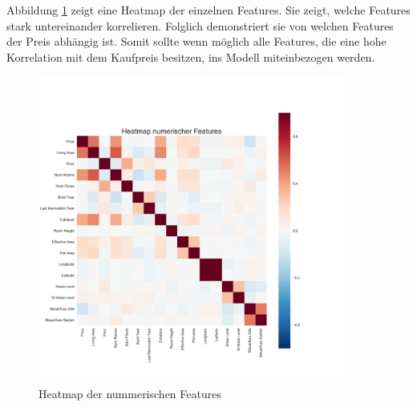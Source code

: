 %
\begin{table}[ht]
\centering
{}
\caption{Statistische Werte der nummerischen Features}
\label{tab:num_features}
\end{table}
%
Abbildung \ref{fig:heatmap} zeigt eine Heatmap der einzelnen Features. Sie zeigt, welche Features stark untereinander korrelieren. Folglich demonstriert sie von welchen Features der Preis abhängig ist. Somit sollte wenn möglich alle Features, die eine hohe Korrelation mit dem Kaufpreis besitzen, ins Modell miteinbezogen werden.
%
\begin{figure}[h!]
\centering
\includegraphics[width=0.9\textwidth]{images/Heatmap_numerical.png}
\caption[Heatmap der nummerischen Features]{Heatmap der nummerischen Features}%
\label{fig:heatmap}
\end{figure}
\newline
%
